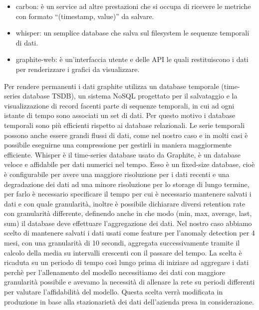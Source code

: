\begin{itemize}
    \item carbon: è un service ad altre prestazioni che si occupa di ricevere le metriche con formato ``(timestamp, value)'' da salvare.
    \item whisper: un semplice database che salva sul filesystem le sequenze temporali di dati.
    \item graphite-web: è un'interfaccia utente e delle API le quali restituiscono i dati per renderizzare i grafici da visualizzare.
\end{itemize}

Per rendere permanenti i dati graphite utilizza un database temporale (time-series database TSDB), un sistema NoSQL progettato per il salvataggio e la visualizzazione di record facenti parte di sequenze temporali, in cui ad ogni istante di tempo sono associati un set di dati. Per questo motivo i database temporali sono più efficienti rispetto ai database relazionali. Le serie temporali possono anche essere grandi flussi di dati, come nel nostro caso e in molti casi è possibile eseguirne una compressione per gestirli in maniera maggiormente efficiente.
Whisper è il time-series database usato da Graphite, è un database veloce e affidabile per dati numerici nel tempo. Esso è un fixed-size database, cioè è configurabile per avere una maggiore risoluzione per i dati recenti e una degradazione dei dati ad una minore risoluzione per lo storage di lungo termine, per farlo è necessario specificare il tempo per cui è necessario mantenere salvati i dati e con quale granularità, inoltre è possibile dichiarare diversi retention rate con granularità differente, definendo anche in che modo (min, max, average, last, sum) il database deve effettuare l'aggregazione dei dati.
Nel nostro caso abbiamo scelto di mantenere salvati i dati usati come feature per l'anomaly detection per 4 mesi, con una granularità di 10 secondi, aggregata successivamente tramite il calcolo della media su intervalli crescenti con il passare del tempo. La scelta è ricaduta su un periodo di tempo così lungo prima di iniziare ad aggregare i dati perchè per l'allenamento del modello necessitiamo dei dati con maggiore granularità possibile e avevamo la necessità di allenare la rete su periodi differenti per valutare l'affidabilità del modello. Questa scelta verrà modificata in produzione in base alla stazionarietà dei dati dell'azienda presa in considerazione.

